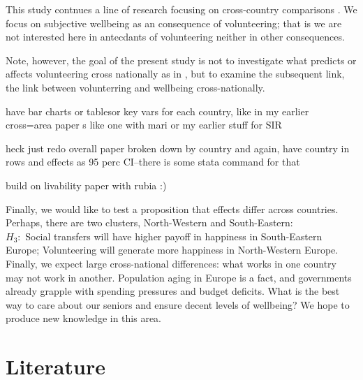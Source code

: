 \documentclass[10pt, letterpaper]{article}
\begin{document}
\begin{spacing}{1.4}
This study contnues a line of research focusing on cross-country comparisons
\citep{hank05,hank09}. We focus on subjective wellbeing as an consequence  of
volunteering; that is we are not interested here in antecdants of volunteering
neither in other consequences. 

Note, however, the goal of the present study is not to investigate what
predicts or affects volunteering cross nationally as in \citet{hank05,hank09},
but to examine the subsequent link, the link between volunterring and wellbeing cross-nationally.


have bar charts or tablesor key vars for each country, like in my earlier
cross=area paper s like one with mari or my earlier stuff for SIR

heck just redo overall paper broken down by country and again, have country in
rows and effects as 95 perc CI--there is some stata command for that

build on livability paper with rubia :)



Finally, we would like to test a proposition that effects differ across countries. %
Perhaps, there are two clusters, North-Western and South-Eastern:\\

\noindent$H_3:$ Social transfers  will have
higher payoff in happiness in South-Eastern Europe; Volunteering will generate more
happiness in North-Western Europe.\\ %



Finally, we expect large cross-national differences: what works in one
country may not work in another. Population aging in Europe is a fact, and
governments already grapple with spending pressures and budget deficits. What is
the best way to care about our seniors and ensure decent levels of wellbeing? We
hope to produce new knowledge in this area.  

\section{Literature}


\end{spacing}
\end{document}
